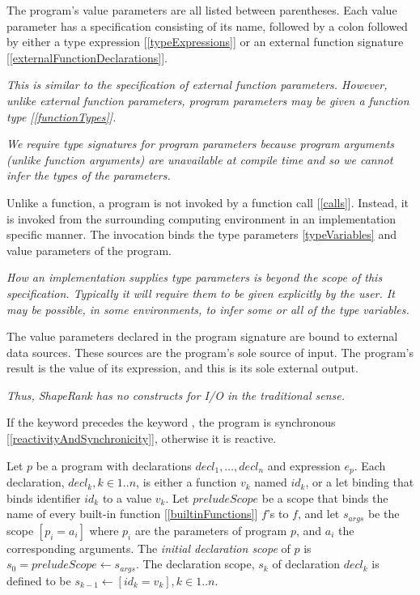 \documentclass{article}
\begin{document}
The program's value parameters are all listed between parentheses.  Each value parameter has a specification consisting of its name, followed by a colon followed by either a type expression [\ref{typeExpressions}] or an external function signature [\ref{externalFunctionDeclarations}].

{\em This is similar to the specification of external function parameters. However, unlike external function parameters, program parameters may be given a function type [\ref{functionTypes}].
} 


{\em
We require type signatures for program parameters because program arguments (unlike function arguments) are unavailable at compile time and so we cannot
infer the types of the parameters.
}

Unlike a function, a program is not invoked by a function call [\ref{calls}]. Instead, it is invoked from the surrounding computing environment in an implementation specific manner.  The invocation binds the type parameters \ref{typeVariables} and value parameters of the program. 

{\em
How an implementation supplies type parameters is beyond the scope of this specification. Typically it will require them to be given explicitly by the user.
It may be possible, in some environments, to infer some or all of the type variables.
}

The value parameters declared in the program signature are bound to external data sources. These sources are the program's sole source of input. The program's result is the value of its expression, and this is its sole external output. 

{\em 
Thus, ShapeRank has no constructs for I/O in the traditional sense.
}

If the keyword \SYNC precedes the keyword \PROGRAM, the program is synchronous [\ref{reactivityAndSynchronicity}], otherwise it is reactive.

Let $p$ be a program with declarations $decl_1, \ldots, decl_n$ and expression $e_p$. Each declaration, $decl_k, k \in 1..n$, is either a function $v_k$ named $id_k$, or a let binding that binds identifier $id_k$ to a value $v_k$.
Let $preludeScope$ be a scope that binds the name of every built-in function [\ref{builtinFunctions}] $f$'s  to $f$, and let $s_{args}$ be the scope $[p_i = a_i]$  where $p_i$ are the parameters of program $p$, and $a_i$ the corresponding arguments. The {\em initial declaration scope} of $p$ is $s_0 = preludeScope \leftarrow s_{args}$.
The declaration scope, $s_k$ of declaration $decl_k$ is defined to be $s_{k-1}  \leftarrow [id_k = v_k],  k \in 1..n$.
\end{document}
